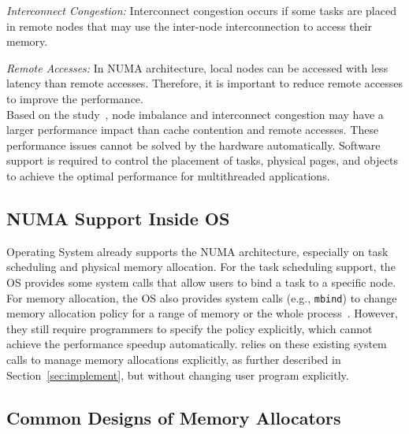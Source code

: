 \textit{Interconnect Congestion:} Interconnect congestion occurs if some tasks are placed in remote nodes that may use the inter-node interconnection to access their memory. 

\textit{Remote Accesses:} In NUMA architecture, local nodes can be accessed with less latency than remote accesses. Therefore, it is important to reduce remote accesses to improve the performance.\\


 Based on the study~\cite{Blagodurov:2011:CNC:2002181.2002182}, node imbalance and interconnect congestion may have a larger performance impact than cache contention and remote accesses. These performance issues cannot be solved by the hardware automatically. Software support is required to control the placement of tasks, physical pages, and objects to achieve the optimal performance for multithreaded applications.  

\subsection{NUMA Support Inside OS} 
Operating System already supports the NUMA architecture, especially on task scheduling and physical memory allocation. For the task scheduling support, the OS provides some system calls that allow users to bind a task to a specific node. For memory allocation, the OS also provides system calls (e.g., \texttt{mbind}) to change memory allocation policy for a range of memory or the whole process~\cite{lameter2013numa, diener2015locality}. However, they still require programmers to specify the policy explicitly, which cannot achieve the performance speedup automatically. \NM{} relies on these existing system calls to manage memory allocations explicitly, as further described in Section~\ref{sec:implement}, but without changing user program explicitly.

\subsection{Common Designs of Memory Allocators}
\label{sec:commondesign}

